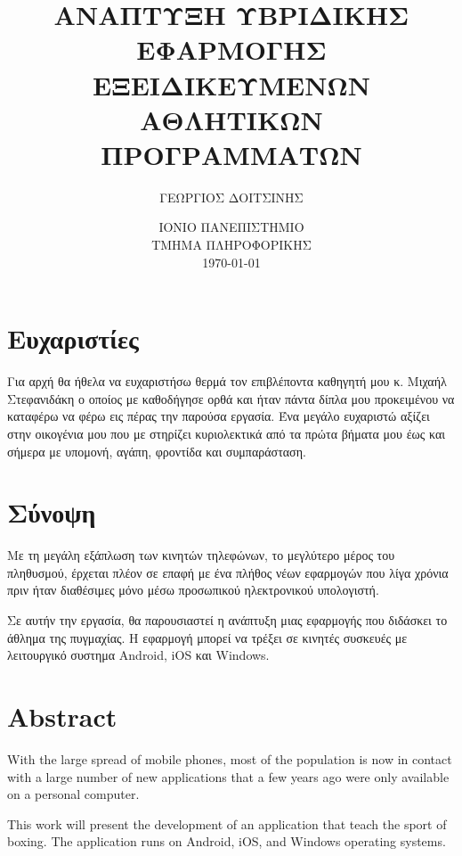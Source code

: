 \documentclass[a4paper,12pt]{article}
\begin{document}
	
	\title{\Large\textbf{{ΑΝΑΠΤΥΞΗ ΥΒΡΙΔΙΚΗΣ ΕΦΑΡΜΟΓΗΣ ΕΞΕΙΔΙΚΕΥΜΕΝΩΝ ΑΘΛΗΤΙΚΩΝ ΠΡΟΓΡΑΜΜΑΤΩΝ}}}
	
	\author{\large{{ΓΕΩΡΓΙΟΣ ΔΟΙΤΣΙΝΗΣ}}}
	
	\date{ΙΟΝΙΟ ΠΑΝΕΠΙΣΤΗΜΙΟ \\ ΤΜΗΜΑ ΠΛΗΡΟΦΟΡΙΚΗΣ \\[5mm] \today}
	
	\maketitle
	
	\newpage
	 \section{Ευχαριστίες}

		Για αρχή θα ήθελα να ευχαριστήσω θερμά τον επιβλέποντα καθηγητή μου κ. Μιχαήλ 
		Στεφανιδάκη ο οποίος με καθοδήγησε ορθά και ήταν πάντα δίπλα μου προκειμένου να
		καταφέρω να φέρω εις πέρας την παρούσα εργασία. 
		Ένα μεγάλο ευχαριστώ αξίζει στην οικογένια μου που με στηρίζει κυριολεκτικά από τα
		πρώτα βήματα μου έως και σήμερα με υπομονή, αγάπη, φροντίδα και συμπαράσταση.
		
 	\newpage		
 	\section{Σύνοψη}

		Με τη μεγάλη εξάπλωση των κινητών τηλεφώνων, το μεγλύτερο μέρος του πληθυσμού, έρχεται πλέον σε επαφή  
		με ένα πλήθος νέων εφαρμογών που λίγα χρόνια πριν ήταν διαθέσιμες μόνο μέσω προσωπικού ηλεκτρονικού υπολογιστή.

		Σε αυτήν την εργασία, θα παρουσιαστεί η ανάπτυξη μιας εφαρμογής που διδάσκει το άθλημα της πυγμαχίας. Η εφαρμογή μπορεί να τρέξει
		σε κινητές συσκευές με λειτουργικό συστημα Android, iOS και Windows.
	 		
 	\newpage
 	\section{Abstract} 
		
		With the large spread of mobile phones, most of the population is now in contact
		with a large number of new applications that a few years ago were only available on a personal computer.
		
		This work will present the development of an application that teach the sport of boxing. The application runs
		on Android, iOS, and Windows operating systems.
\end{document}
